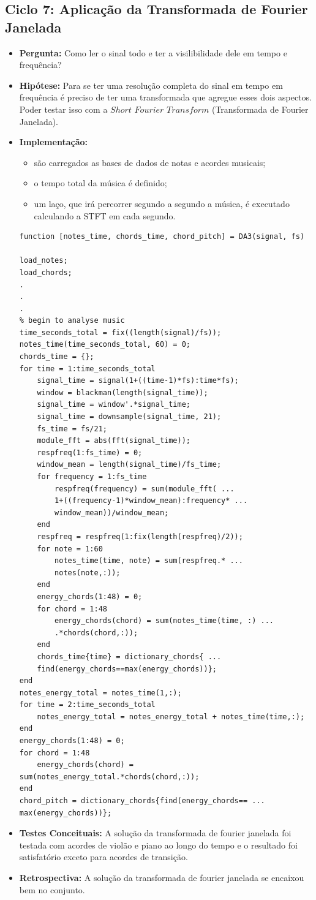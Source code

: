 \subsection{Ciclo 7: Aplicação da Transformada de Fourier Janelada}
\label{subsec:ciclo_7}
\begin{itemize}
\item \textbf{Pergunta:} Como ler o sinal todo e ter a visilibilidade dele em tempo e frequência?
\item \textbf{Hipótese:} Para se ter uma resolução completa do sinal em tempo em frequência é preciso de ter uma transformada que agregue esses dois aspectos. Poder testar isso com a $Short$ $Fourier$ $Transform$ (Transformada de Fourier Janelada).   
\item \textbf{Implementação:} 
\begin{itemize} 
	\item são carregados as bases de dados de notas e acordes musicais;
	\item o tempo total da música é definido;
	\item um laço, que irá percorrer segundo a segundo a música, é executado calculando a STFT em cada segundo.
\end{itemize}
\begin{lstlisting}
function [notes_time, chords_time, chord_pitch] = DA3(signal, fs)

load_notes;
load_chords;
.
.
.
% begin to analyse music
time_seconds_total = fix((length(signal)/fs));
notes_time(time_seconds_total, 60) = 0;
chords_time = {};
for time = 1:time_seconds_total
    signal_time = signal(1+((time-1)*fs):time*fs);
    window = blackman(length(signal_time));
    signal_time = window'.*signal_time;
    signal_time = downsample(signal_time, 21);
    fs_time = fs/21;
    module_fft = abs(fft(signal_time));
    respfreq(1:fs_time) = 0;
    window_mean = length(signal_time)/fs_time;
    for frequency = 1:fs_time
        respfreq(frequency) = sum(module_fft( ...
        1+((frequency-1)*window_mean):frequency* ...
        window_mean))/window_mean;
    end
    respfreq = respfreq(1:fix(length(respfreq)/2));
    for note = 1:60
        notes_time(time, note) = sum(respfreq.* ...
        notes(note,:));    
    end
    energy_chords(1:48) = 0;
    for chord = 1:48
        energy_chords(chord) = sum(notes_time(time, :) ...
        .*chords(chord,:));
    end
    chords_time{time} = dictionary_chords{ ...
    find(energy_chords==max(energy_chords))};
end
notes_energy_total = notes_time(1,:);
for time = 2:time_seconds_total
    notes_energy_total = notes_energy_total + notes_time(time,:);
end
energy_chords(1:48) = 0;
for chord = 1:48
    energy_chords(chord) = sum(notes_energy_total.*chords(chord,:));
end
chord_pitch = dictionary_chords{find(energy_chords== ...
max(energy_chords))};
\end{lstlisting}
\item \textbf{Testes Conceituais:} A solução da transformada de fourier janelada foi testada com acordes de violão e piano ao longo do tempo e o resultado foi satisfatório exceto para acordes de transição.
\item \textbf{Retrospectiva:} A solução da transformada de fourier janelada se encaixou bem no conjunto.  
\end{itemize}


